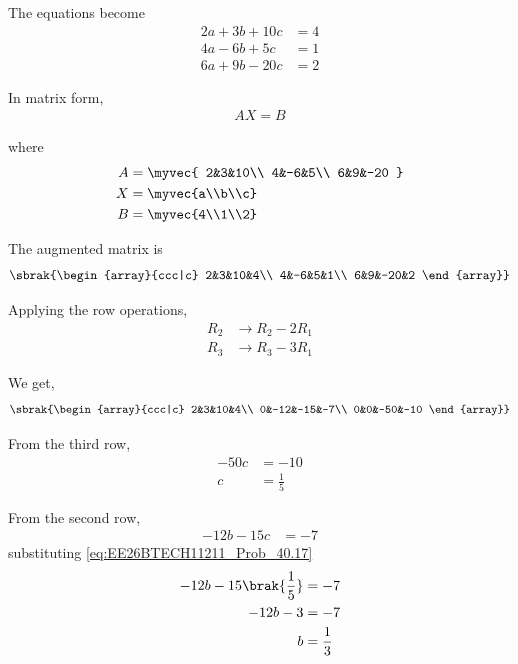 \begin{enumerate}[label=\thesubsection.\arabic*, ref=\thesubsection.\theenumi]
The equations become
\begin{align}
    2a+3b+10c&=4\\
    4a-6b+5c&=1\\
    6a+9b-20c&=2
\end{align}

In matrix form,
\begin{align}
    AX=B
\end{align}

where
\begin{align}
    A&=\myvec{
    2&3&10\\
    4&-6&5\\
    6&9&-20
    }\\
    X&=\myvec{a\\b\\c}\\
    B&=\myvec{4\\1\\2}
\end{align}

The augmented matrix is
\begin{align}
    \sbrak{\begin{array}{ccc|c}
    2&3&10&4\\
    4&-6&5&1\\
    6&9&-20&2
    \end{array}}
\end{align}

Applying the row operations,
\begin{align}
    R_2&\rightarrow R_2-2R_1\\
    R_3&\rightarrow R_3-3R_1
\end{align}

We get,
\begin{align}
     \sbrak{\begin{array}{ccc|c}
    2&3&10&4\\
    0&-12&-15&-7\\
    0&0&-50&-10
    \end{array}}
\end{align}

From the third row,
\begin{align}
    -50c&=-10\\
    c&=\frac{1}{5}\label{eq:EE26BTECH11211_Prob_40.17}
\end{align}

From the second row,
\begin{align}
    -12b-15c&=-7\end{align}
    substituting \eqref{eq:EE26BTECH11211_Prob_40.17}
    \begin{align}
    -12b-15\brak{\frac{1}{5}}&=-7\\
    -12b-3&=-7\\
    b&=\frac{1}{3}\label{eq:EE26BTECH11211_Prob_40.21}
\end{align}


\end{enumerate}
